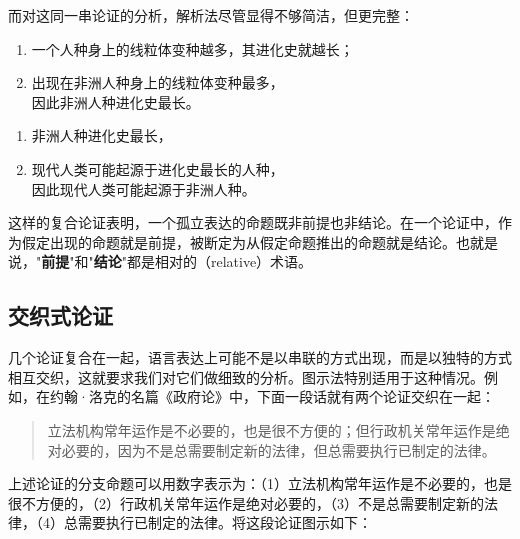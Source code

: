 而对这同一串论证的分析，解析法尽管显得不够简洁，但更完整：

\begin{enumerate}
  \item 一个人种身上的线粒体变种越多，其进化史就越长；
  \item 出现在非洲人种身上的线粒体变种最多，\\
  因此非洲人种进化史最长。
\end{enumerate}

\begin{enumerate}
  \item 非洲人种进化史最长，
  \item 现代人类可能起源于进化史最长的人种，\\
  因此现代人类可能起源于非洲人种。
\end{enumerate}

这样的复合论证表明，一个孤立表达的命题既非前提也非结论。在一个论证中，作为假定出现的命题就是前提，被断定为从假定命题推出的命题就是结论。也就是说，"\textbf{前提}"和"\textbf{结论}"都是相对的（relative）术语。

\subsection{交织式论证}

几个论证复合在一起，语言表达上可能不是以串联的方式出现，而是以独特的方式相互交织，这就要求我们对它们做细致的分析。图示法特别适用于这种情况。例如，在约翰·洛克的名篇《政府论》中，下面一段话就有两个论证交织在一起：

\begin{quotation}
立法机构常年运作是不必要的，也是很不方便的；但行政机关常年运作是绝对必要的，因为不是总需要制定新的法律，但总需要执行已制定的法律。
\end{quotation}

上述论证的分支命题可以用数字表示为：（1）立法机构常年运作是不必要的，也是很不方便的，（2）行政机关常年运作是绝对必要的，（3）不是总需要制定新的法律，（4）总需要执行已制定的法律。将这段论证图示如下：

